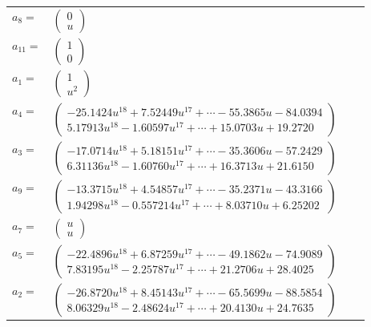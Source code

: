 \documentclass[1p]{elsarticle_modified}
\theoremstyle{definition}
\begin{document}
\begin{tabular}{m{7pt} m{180pt} m{7pt} m{180pt} }
\flushright $a_{8}=$&$\begin{pmatrix}0\\u\end{pmatrix}$ \\
\flushright $a_{11}=$&$\begin{pmatrix}1\\0\end{pmatrix}$ \\
\flushright $a_{1}=$&$\begin{pmatrix}1\\u^2\end{pmatrix}$ \\
\flushright $a_{4}=$&$\begin{pmatrix}-25.1424 u^{18}+7.52449 u^{17}+\cdots-55.3865 u-84.0394\\5.17913 u^{18}-1.60597 u^{17}+\cdots+15.0703 u+19.2720\end{pmatrix}$ \\
\flushright $a_{3}=$&$\begin{pmatrix}-17.0714 u^{18}+5.18151 u^{17}+\cdots-35.3606 u-57.2429\\6.31136 u^{18}-1.60760 u^{17}+\cdots+16.3713 u+21.6150\end{pmatrix}$ \\
\flushright $a_{9}=$&$\begin{pmatrix}-13.3715 u^{18}+4.54857 u^{17}+\cdots-35.2371 u-43.3166\\1.94298 u^{18}-0.557214 u^{17}+\cdots+8.03710 u+6.25202\end{pmatrix}$ \\
\flushright $a_{7}=$&$\begin{pmatrix}u\\u\end{pmatrix}$ \\
\flushright $a_{5}=$&$\begin{pmatrix}-22.4896 u^{18}+6.87259 u^{17}+\cdots-49.1862 u-74.9089\\7.83195 u^{18}-2.25787 u^{17}+\cdots+21.2706 u+28.4025\end{pmatrix}$ \\
\flushright $a_{2}=$&$\begin{pmatrix}-26.8720 u^{18}+8.45143 u^{17}+\cdots-65.5699 u-88.5854\\8.06329 u^{18}-2.48624 u^{17}+\cdots+20.4130 u+24.7635\end{pmatrix}$ \\

\end{tabular}
\end{document}
